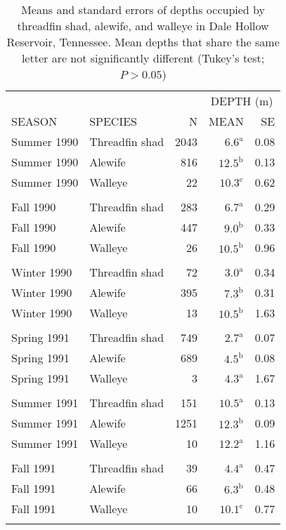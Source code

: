 \begin{table}[tbp]
  \caption{Means and standard errors of depths occupied by threadfin shad, alewife, and walleye in Dale Hollow Reservoir, Tennessee. Mean depths that share the same letter are not significantly different (Tukey's test; $P>0.05$)}
  \label{tab:FishDepths}
  \centering
  \begin{tabular}{llrrr} \hline
    & & & \multicolumn{2}{c}{DEPTH (m)} \\ \cline{4-5}
    SEASON & SPECIES & N & MEAN & SE \\ \hline
    Summer 1990 & Threadfin shad & 2043 & $6.6^{\textrm{a}}$ & 0.08 \\
    Summer 1990 & Alewife & 816 & $12.5^{\textrm{b}}$ & 0.13 \\
    Summer 1990 & Walleye & 22 & $10.3^{\textrm{c}}$ & 0.62 \\
    \\
    Fall 1990 & Threadfin shad & 283 & $6.7^{\textrm{a}}$ & 0.29 \\
    Fall 1990 & Alewife & 447 & $9.0^{\textrm{b}}$ & 0.33 \\
    Fall 1990 & Walleye & 26 & $10.5^{\textrm{b}}$ & 0.96 \\
    \\
    Winter 1990 & Threadfin shad & 72 & $3.0^{\textrm{a}}$ & 0.34 \\
    Winter 1990 & Alewife & 395 & $7.3^{\textrm{b}}$ & 0.31 \\
    Winter 1990 & Walleye & 13 & $10.5^{\textrm{b}}$ & 1.63 \\
    \\
    Spring 1991 & Threadfin shad & 749 & $2.7^{\textrm{a}}$ & 0.07 \\
    Spring 1991 & Alewife & 689 & $4.5^{\textrm{b}}$ & 0.08 \\
    Spring 1991 & Walleye & 3 & $4.3^{\textrm{a}}$ & 1.67 \\
    \\
    Summer 1991 & Threadfin shad & 151 & $10.5^{\textrm{a}}$ & 0.13 \\
    Summer 1991 & Alewife & 1251 & $12.3^{\textrm{b}}$ & 0.09 \\
    Summer 1991 & Walleye & 10 & $12.2^{\textrm{a}}$ & 1.16 \\
    \\
    Fall 1991 & Threadfin shad & 39 & $4.4^{\textrm{a}}$ & 0.47 \\
    Fall 1991 & Alewife & 66 & $6.3^{\textrm{b}}$ & 0.48 \\
    Fall 1991 & Walleye & 10 & $10.1^{\textrm{c}}$ & 0.77 \\
    \\ \hline
  \end{tabular}
\end{table}

